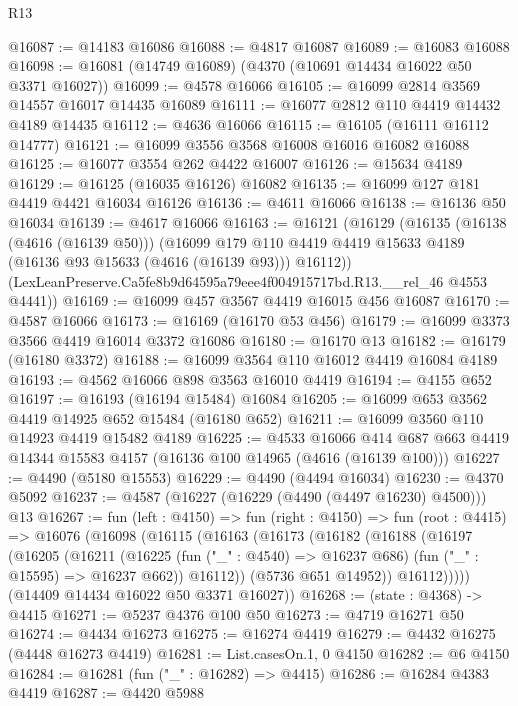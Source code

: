 \begin{lexlean}{R13}
\begin{coremodule}
@16087 := @14183 @16086
@16088 := @4817 @16087
@16089 := @16083 @16088
@16098 := @16081 (@14749 @16089) (@4370 (@10691 @14434 @16022 @50 @3371 @16027))
@16099 := @4578 @16066
@16105 := @16099 @2814 @3569 @14557 @16017 @14435 @16089
@16111 := @16077 @2812 @110 @4419 @14432 @4189 @14435
@16112 := @4636 @16066
@16115 := @16105 (@16111 @16112 @14777)
@16121 := @16099 @3556 @3568 @16008 @16016 @16082 @16088
@16125 := @16077 @3554 @262 @4422 @16007
@16126 := @15634 @4189
@16129 := @16125 (@16035 @16126) @16082
@16135 := @16099 @127 @181 @4419 @4421 @16034 @16126
@16136 := @4611 @16066
@16138 := @16136 @50 @16034
@16139 := @4617 @16066
@16163 := @16121
    (@16129
      (@16135
        (@16138 (@4616 (@16139 @50)))
        (@16099 @179 @110 @4419 @4419 @15633 @4189 (@16136 @93 @15633 (@4616 (@16139 @93))) @16112))
      (LexLeanPreserve.Ca5fe8b9d64595a79eee4f004915717bd.R13.__rel_46 @4553 @4441))
@16169 := @16099 @457 @3567 @4419 @16015 @456 @16087
@16170 := @4587 @16066
@16173 := @16169 (@16170 @53 @456)
@16179 := @16099 @3373 @3566 @4419 @16014 @3372 @16086
@16180 := @16170 @13
@16182 := @16179 (@16180 @3372)
@16188 := @16099 @3564 @110 @16012 @4419 @16084 @4189
@16193 := @4562 @16066 @898 @3563 @16010 @4419
@16194 := @4155 @652
@16197 := @16193 (@16194 @15484) @16084
@16205 := @16099 @653 @3562 @4419 @14925 @652 @15484 (@16180 @652)
@16211 := @16099 @3560 @110 @14923 @4419 @15482 @4189
@16225 := @4533
    @16066
    @414
    @687
    @663
    @4419
    @14344
    @15583
    @4157
    (@16136 @100 @14965 (@4616 (@16139 @100)))
@16227 := @4490 (@5180 @15553)
@16229 := @4490 (@4494 @16034)
@16230 := @4370 @5092
@16237 := @4587 (@16227 (@16229 (@4490 (@4497 @16230) @4500))) @13
@16267 := fun (left : @4150) =>
  fun (right : @4150) =>
  fun (root : @4415) =>
  @16076
    (@16098
      (@16115
        (@16163
          (@16173
            (@16182
              (@16188
                (@16197
                  (@16205
                    (@16211
                      (@16225
                        (fun ("_" : @4540) => @16237 @686)
                        (fun ("_" : @15595) => @16237 @662))
                      @16112))
                  (@5736 @651 @14952))
                @16112)))))
      (@14409 @14434 @16022 @50 @3371 @16027))
@16268 := (state : @4368) -> @4415
@16271 := @5237 @4376 @100 @50
@16273 := @4719 @16271 @50
@16274 := @4434 @16273
@16275 := @16274 @4419
@16279 := @4432 @16275 (@4448 @16273 @4419)
@16281 := List.casesOn.{1, 0} @4150
@16282 := @6 @4150
@16284 := @16281 (fun ("_" : @16282) => @4415)
@16286 := @16284 @4383 @4419
@16287 := @4420 @5988

\end{coremodule}
\end{lexlean}
